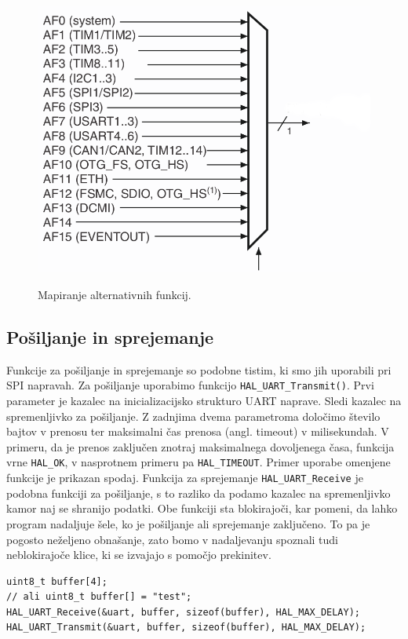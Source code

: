 \documentclass[12pt,letterpaper]{article}
\begin{document}
\begin{figure}[ht!]
  \centering
  \caption{Mapiranje alternativnih funkcij.}
  \includegraphics{images/vaja5/SPI_AF.png}
  \label{alternativne_funkcije}
\end{figure}

\subsection*{Pošiljanje in sprejemanje}

Funkcije za pošiljanje in sprejemanje so podobne tistim, ki smo jih uporabili pri SPI napravah. Za pošiljanje uporabimo funkcijo \texttt{HAL\_UART\_Transmit()}. Prvi parameter je kazalec na inicializacijsko strukturo UART naprave. Sledi kazalec na spremenljivko za pošiljanje. Z zadnjima dvema parametroma določimo število bajtov v prenosu ter maksimalni čas prenosa (angl. timeout) v milisekundah. V primeru, da je prenos zaključen znotraj maksimalnega dovoljenega časa, funkcija vrne \texttt{HAL\_OK}, v nasprotnem primeru pa \texttt{HAL\_TIMEOUT}. Primer uporabe omenjene funkcije je prikazan spodaj. Funkcija za sprejemanje \texttt{HAL\_UART\_Receive} je podobna funkciji za pošiljanje, s to razliko da podamo kazalec na spremenljivko kamor naj se shranijo podatki. Obe funkciji sta blokirajoči, kar pomeni, da lahko program nadaljuje šele, ko je pošiljanje ali sprejemanje zaključeno. To pa je pogosto neželjeno obnašanje, zato bomo v nadaljevanju spoznali tudi neblokirajoče klice, ki se izvajajo s pomočjo prekinitev.

\begin{center}
\begin{lstlisting}[style=CStyle]
uint8_t buffer[4]; 
// ali uint8_t buffer[] = "test";
HAL_UART_Receive(&uart, buffer, sizeof(buffer), HAL_MAX_DELAY);
HAL_UART_Transmit(&uart, buffer, sizeof(buffer), HAL_MAX_DELAY);
\end{lstlisting}
\end{center}
\end{document}
